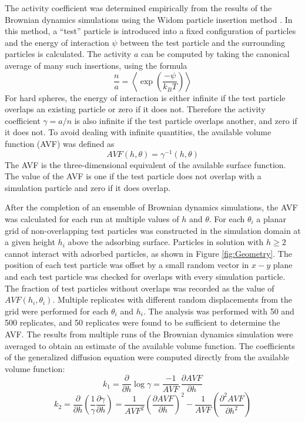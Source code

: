 The activity coefficient was determined empirically from the results
of the Brownian dynamics simulations using the Widom particle insertion
method \cite{Widom1963}. In this method, a {}``test'' particle
is introduced into a fixed configuration of particles and the energy
of interaction $\psi$ between the test particle and the surrounding
particles is calculated. The activity $a$ can be computed by taking
the canonical average of many such insertions, using the formula\begin{equation}
\frac{n}{a}=\left\langle \exp\left(\frac{-\psi}{k_{B}T}\right)\right\rangle \label{eq:Widom equation}\end{equation}
For hard spheres, the energy of interaction is either infinite if
the test particle overlaps an existing particle or zero if it does
not. Therefore the activity coefficient $\gamma=a/n$ is also infinite
if the test particle overlaps another, and zero if it does not. To
avoid dealing with infinite quantities, the available volume function
(AVF) was defined as \begin{equation}
AVF\left(h,\theta\right)=\gamma^{-1}\left(h,\theta\right)\label{eq:AVF}\end{equation}
The AVF is the three-dimensional equivalent of the available surface
function. The value of the AVF is one if the test particle does not
overlap with a simulation particle and zero if it does overlap. 

After the completion of an ensemble of Brownian dynamics simulations,
the AVF was calculated for each run at multiple values of $h$ and
$\theta$. For each $\theta_{i}$ a planar grid of non-overlapping
test particles was constructed in the simulation domain at a given
height $h_{i}$ above the adsorbing surface. Particles in solution
with $h\geq2$ cannot interact with adsorbed particles, as shown in
Figure \ref{fig:Geometry}. The position of each test particle was
offset by a small random vector in $x-y$ plane and each test particle
was checked for overlaps with every simulation particle. The fraction
of test particles without overlaps was recorded as the value of $AVF\left(h_{i},\theta_{i}\right)$.
Multiple replicates with different random displacements from the grid
were performed for each $\theta_{i}$ and $h_{i}$. The analysis was
performed with 50 and 500 replicates, and 50 replicates were found
to be sufficient to determine the AVF. The results from multiple runs
of the Brownian dynamics simulation were averaged to obtain an estimate
of the available volume function. The coefficients of the generalized
diffusion equation were computed directly from the available volume
function:\[
k_{1}=\frac{\partial}{\partial h}\log\gamma=\frac{-1}{AVF}\,\frac{\partial AVF}{\partial h}\]
\[
k_{2}=\frac{\partial}{\partial h}\left(\frac{1}{\gamma}\frac{\partial\gamma}{\partial h}\right)=\frac{1}{AVF^{2}}\left(\frac{\partial AVF}{\partial h}\right)^{2}-\frac{1}{AVF}\left(\frac{\partial^{2}AVF}{\partial h^{2}}\right)\]



